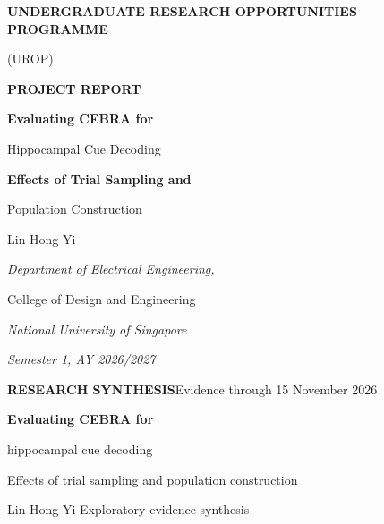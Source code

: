 \documentclass[10pt,a4paper]{article}
\begin{document}
\hypersetup{pageanchor=false}
\begin{titlepage}
\thispagestyle{empty}
\centering\sffamily
\vspace*{10mm}
{\fontsize{14}{18}\selectfont\bfseries
UNDERGRADUATE RESEARCH OPPORTUNITIES PROGRAMME\par
(UROP)\par}
\vspace{6mm}
{\Large\bfseries PROJECT REPORT\par}
\vspace{28mm}
{\fontsize{17}{22}\selectfont\bfseries
Evaluating CEBRA for\par
Hippocampal Cue Decoding\par}
\vspace{4mm}
{\large\bfseries Effects of Trial Sampling and\par Population Construction\par}
\vspace{21mm}
{\large Lin Hong Yi\par}
\vspace{27mm}
{\itshape Department of Electrical Engineering,\par
College of Design and Engineering\par}
\vspace{3mm}
{\itshape National University of Singapore\par}
\vspace{25mm}
{\itshape Semester 1, AY 2026/2027\par}
\vfill
\end{titlepage}
\hypersetup{pageanchor=true}
\setcounter{page}{1}
\thispagestyle{empty}
{\small\color{accent}\textbf{RESEARCH SYNTHESIS}\hfill Evidence through 15 November 2026}\par
\vspace{5mm}
{\LARGE\bfseries\color{ink}Evaluating CEBRA for\par hippocampal cue decoding}\par
\vspace{3mm}
{\large Effects of trial sampling and population construction}\par
\vspace{2mm}
{\small Lin Hong Yi \quad\textbullet\quad Exploratory evidence synthesis}
\end{document}
